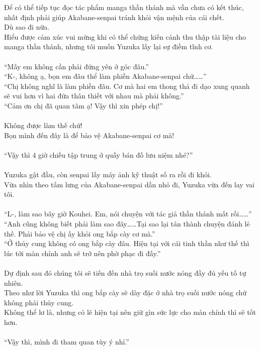 \documentclass[12pt,a4paper, twosides]{book}
\begin{document}
Để có thể tiếp tục đọc tác phẩm manga thần thánh mà vẫn chưa có kết thúc, nhất định phải giúp Akabane-senpai tránh khỏi vận mệnh của cái chết.\\
Dù sao đi nữa.\\
Hiểu được cảm xúc vui mừng khi có thể chứng kiến cảnh thu thập tài liệu cho manga thần thánh, nhưng tôi muốn Yuzuka lấy lại sự điềm tĩnh cơ.\\
\\
“Mấy em không cần phải đứng yên ở góc đâu.”\\
“K-, không ạ, bọn em đâu thể làm phiền Akabane-senpai chứ……”\\
“Chị không nghĩ là làm phiền đâu. Cơ mà hai em thong thả đi dạo xung quanh sẽ vui hơn vì hai đứa thân thiết với nhau mà phải không.”\\
“Cảm ơn chị đã quan tâm ạ! Vậy thì xin phép chị!”\\
\\
Không được làm thế chứ!\\
Bọn mình đến đây là để bảo vệ Akabane-senpai cơ mà!\\
\\
“Vậy thì 4 giờ chiều tập trung ở quầy bán đồ lưu niệm nhé?”\\
\\
Yuzuka gật đầu, còn senpai lấy máy ảnh kỹ thuật số ra rồi đi khỏi.\\
Vừa nhìn theo tấm lưng của Akabane-senpai dần nhỏ đi, Yuzuka vừa đến lay vai tôi.\\
\\
“L-, làm sao bây giờ Kouhei. Em, nói chuyện với tác giả thần thánh mất rồi……”\\
“Anh cũng không biết phải làm sao đây……Tại sao lại tán thành chuyện đánh lẻ thế. Phải bảo vệ chị ấy khỏi ong bắp cày cơ mà.”\\
“Ở thủy cung không có ong bắp cày đâu. Hiện tại với cái tinh thần như thế thì lúc tới màn chính anh sẽ trở nên phờ phạc đi đấy.”\\
\\
Dự định sau đó chúng tôi sẽ tiến đến nhà trọ suối nước nóng đầy đủ yếu tố tự nhiên.\\
Theo như lời Yuzuka thì ong bắp cày sẽ dày đặc ở nhà trọ suối nước nóng chứ không phải thủy cung.\\
Không thể lơ là, nhưng có lẽ hiện tại nên giữ gìn sức lực cho màn chính thì sẽ tốt hơn.\\
\\
“Vậy thì, mình đi tham quan tùy ý nhỉ.”\\
\end{document}

